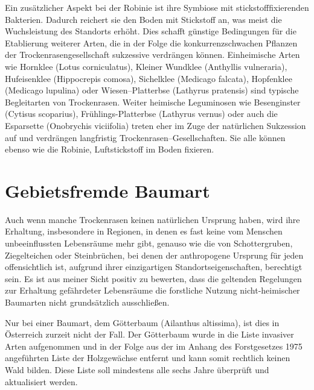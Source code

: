 \documentclass[twocolumn]{scrartcl}
\begin{document}
Ein zusätzlicher Aspekt bei der Robinie ist ihre Symbiose mit
stickstofffixierenden Bakterien. Dadurch reichert sie den Boden mit Stickstoff
an, was meist die Wuchsleistung des Standorts erhöht. Dies schafft günstige
Bedingungen für die Etablierung weiterer Arten, die in der Folge die
konkurrenzschwachen Pflanzen der Trockenrasengesellschaft sukzessive verdrängen
können. Einheimische Arten wie Hornklee (Lotus corniculatus), Kleiner Wundklee
(Anthyllis vulneraria), Hufeisenklee (Hippocrepis comosa), Sichelklee (Medicago
falcata), Hopfenklee (Medicago lupulina) oder Wiesen--Platterbse (Lathyrus
pratensis) sind typische Begleitarten von Trockenrasen.
Weiter heimische Leguminosen wie Besenginster (Cytisus scoparius),
Frühlings-Platterbse (Lathyrus vernus) oder auch die Esparsette (Onobrychis
viciifolia) treten eher im Zuge der natürlichen Sukzession auf und verdrängen
langfristig Trockenrasen--Gesellschaften. Sie alle können ebenso wie die
Robinie, Luftstickstoff im Boden fixieren.

\section{Gebietsfremde Baumart}

Auch wenn manche Trockenrasen keinen natürlichen Ursprung haben, wird
ihre Erhaltung, insbesondere in Regionen, in denen es fast keine vom
Menschen unbeeinflussten Lebensräume mehr gibt, genauso wie die von
Schottergruben, Ziegelteichen oder Steinbrüchen, bei denen der
anthropogene Ursprung für jeden offensichtlich ist, aufgrund ihrer
einzigartigen Standortseigenschaften, berechtigt sein. Es ist aus
meiner Sicht positiv zu bewerten, dass die geltenden Regelungen zur
Erhaltung gefährdeter Lebensräume die forstliche Nutzung
nicht-heimischer Baumarten nicht grundsätzlich ausschließen.

Nur bei einer Baumart, dem Götterbaum (Ailanthus altissima), ist dies
in Österreich zurzeit nicht der Fall. Der Götterbaum wurde in die
Liste invasiver Arten aufgenommen
\citep{eu2019verordnungListeInvasiverArten,eu2014verordnungInvasiverArten}
und in der Folge aus der im Anhang des Forstgesetzes 1975 angeführten
Liste der Holzgewächse entfernt und kann somit rechtlich keinen Wald
bilden. Diese Liste soll mindestens alle sechs Jahre überprüft und
aktualisiert werden.
\end{document}
